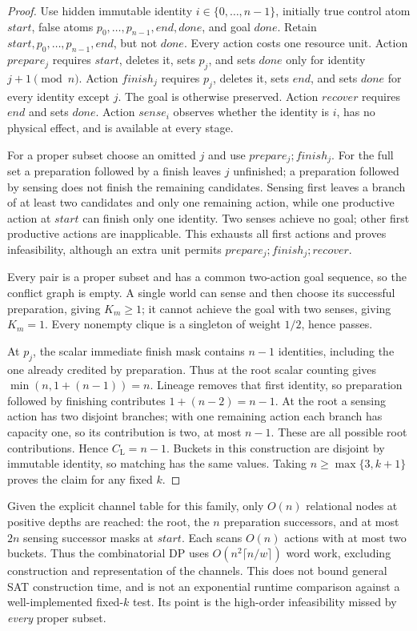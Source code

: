 \documentclass[11pt]{article}
\theoremstyle{definition}
\newcommand{\CL}{C_{\mathrm L}}
\begin{document}
\begin{proof}
Use hidden immutable identity $i\in\{0,\ldots,n-1\}$, initially true control
atom $start$, false atoms $p_0,\ldots,p_{n-1},end,done$, and goal $done$.
Retain $start,p_0,\ldots,p_{n-1},end$, but not $done$.
Every action costs one resource unit. Action $prepare_j$ requires $start$,
deletes it, sets $p_j$, and sets $done$ only for identity $j+1\pmod n$.
Action $finish_j$ requires $p_j$, deletes it, sets $end$, and sets $done$ for
every identity except $j$. The goal is otherwise preserved. Action $recover$
requires $end$ and sets $done$. Action $sense_i$ observes whether the identity
is $i$, has no physical effect, and is available at every stage.

For a proper subset choose an omitted $j$ and use $prepare_j;finish_j$.
For the full set a preparation followed by a finish leaves $j$ unfinished;
a preparation followed by sensing does not finish the remaining candidates.
Sensing first leaves a branch of at least two candidates and only one remaining
action, while one productive action at $start$ can finish only one identity.
Two senses achieve no goal; other first productive actions are inapplicable.
This exhausts all first actions and proves infeasibility, although an extra
unit permits $prepare_j;finish_j;recover$.

Every pair is a proper subset and has a common two-action goal sequence, so
the conflict graph is empty. A single world can sense and then choose its
successful preparation, giving $K_m\geq1$; it cannot achieve the goal with
two senses, giving $K_m=1$. Every nonempty clique is a singleton of weight
$1/2$, hence passes.

At $p_j$, the scalar immediate finish mask contains $n-1$ identities, including
the one already credited by preparation. Thus at the root scalar counting
gives $\min(n,1+(n-1))=n$. Lineage removes that first identity, so preparation
followed by finishing contributes $1+(n-2)=n-1$. At the root a sensing action
has two disjoint branches; with one remaining action each branch has capacity
one, so its contribution is two, at most $n-1$. These are all possible root
contributions. Hence $\CL=n-1$. Buckets in this construction are disjoint by
immutable identity, so matching has the same values. Taking
$n\geq\max\{3,k+1\}$ proves the claim for any fixed $k$.
\end{proof}

Given the explicit channel table for this family, only $O(n)$ relational
nodes at positive depths are reached: the root, the $n$ preparation successors,
and at most $2n$ sensing successor masks at $start$. Each scans $O(n)$ actions
with at most two buckets. Thus the combinatorial DP uses
$O(n^2\lceil n/w\rceil)$ word work, excluding construction and representation
of the channels. This does not bound general SAT construction time, and is not
an exponential runtime comparison against a well-implemented fixed-$k$ test.
Its point is the high-order infeasibility missed by \emph{every} proper subset.
\end{document}
